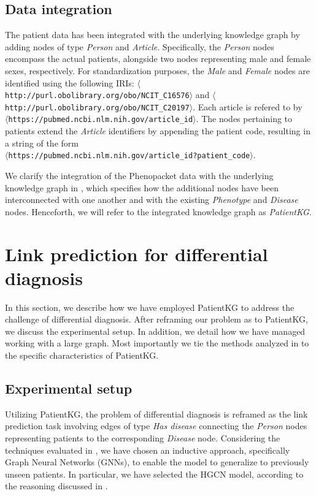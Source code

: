 \subsection{Data integration}
The patient data has been integrated with the underlying knowledge graph by adding nodes of type \emph{Person} and \emph{Article}. Specifically, the \emph{Person} nodes encompass the actual patients, alongside two nodes representing male and female sexes, respectively. For standardization purposes, the \emph{Male} and \emph{Female} nodes are identified using the following IRIs: \texttt{$\langle$http://purl.obolibrary.org/obo/NCIT\_C16576$\rangle$} and \texttt{$\langle$http://purl.obolibrary.org/obo/NCIT\_C20197$\rangle$}. Each article is refered to by \\ \texttt{$\langle$https://pubmed.ncbi.nlm.nih.gov/{article\_id}$\rangle$}. The nodes pertaining to patients extend the \emph{Article} identifiers by appending the patient code, resulting in a string of the form \\ \texttt{$\langle$https://pubmed.ncbi.nlm.nih.gov/{article\_id}?{patient\_code}$\rangle$}. 

We clarify the integration of the Phenopacket data with the underlying knowledge graph in , which specifies how the additional nodes have been interconnected with one another and with the existing \emph{Phenotype} and \emph{Disease} nodes. Henceforth, we will refer to the integrated knowledge graph as \emph{PatientKG}.


\section{Link prediction for differential diagnosis}\label{sec:linkPredictionDiffDiagnosis}
In this section, we describe how we have employed PatientKG to address the challenge of differential diagnosis. After reframing our problem as to PatientKG, we discuss the experimental setup. In addition, we detail how we have managed working with a large graph. Most importantly we tie the methods analyzed in  to the specific characteristics of PatientKG.

\subsection{Experimental setup}\label{sec:expsetup}
Utilizing PatientKG, the problem of differential diagnosis is reframed as the link prediction task involving edges of type \emph{Has disease} connecting the \emph{Person} nodes representing patients to the corresponding \emph{Disease} node. Considering the techniques evaluated in , we have chosen an inductive approach, specifically Graph Neural Networks (GNNs), to enable the model to generalize to previously unseen patients. In particular, we have selected the HGCN model, according to the reasoning discussed in .

